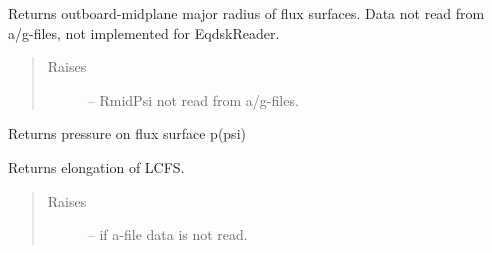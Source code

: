 \documentclass[letterpaper,10pt,english]{sphinxmanual}
\begin{document}
\begin{fulllineitems}
\begin{fulllineitems}
\begin{quote}
\begin{description}
\end{description}\end{quote}

\end{fulllineitems}


\begin{fulllineitems}
\label{eqtools:eqtools.eqdskreader.EqdskReader.getRmidPsi}
Returns outboard-midplane major radius of flux surfaces.
Data not read from a/g-files, not implemented for EqdskReader.
\begin{quote}\begin{description}
\item[{Raises }] \leavevmode
{} -- 
RmidPsi not read from a/g-files.

\end{description}\end{quote}

\end{fulllineitems}


\begin{fulllineitems}
\label{eqtools:eqtools.eqdskreader.EqdskReader.getFluxPres}
Returns pressure on flux surface p(psi)

\end{fulllineitems}


\begin{fulllineitems}
\label{eqtools:eqtools.eqdskreader.EqdskReader.getElongation}
Returns elongation of LCFS.
\begin{quote}\begin{description}
\item[{Raises }] \leavevmode
{} -- 
if a-file data is not read.

\end{description}\end{quote}

\end{fulllineitems}



\end{fulllineitems}
\end{document}
